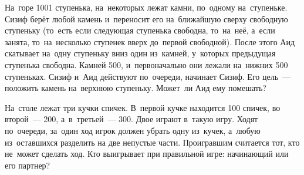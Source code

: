 \begin{problems}
\item
На~горе 1001 ступенька, на~некоторых лежат камни, по~одному на~ступеньке.
Сизиф берёт любой камень и~переносит его на~ближайшую сверху свободную
ступеньку (то~есть если следующая ступенька свободна, то~на~неё, а~если занята,
то~на~несколько ступенек вверх до~первой свободной).
После этого Аид скатывает на~одну ступеньку вниз один из~камней, у~которых
предыдущая ступенька свободна.
Камней 500, и~первоначально они лежали на~нижних 500 ступеньках.
Сизиф и~Аид действуют по~очереди, начинает Сизиф.
Его цель~--- положить камень на~верхнюю ступеньку.
Может~ли Аид ему помешать?

\item
На~столе лежат три кучки спичек.
В~первой кучке находится 100 спичек, во второй~--- 200, а~в~третьей~--- 300.
Двое играют в~такую игру.
Ходят по~очереди, за~один ход игрок должен убрать одну из~кучек, а~любую
из~оставшихся разделить на две непустые части.
Проигравшим считается тот, кто не~может сделать ход.
Кто выигрывает при правильной игре: начинающий или его партнер?

\end{problems}

